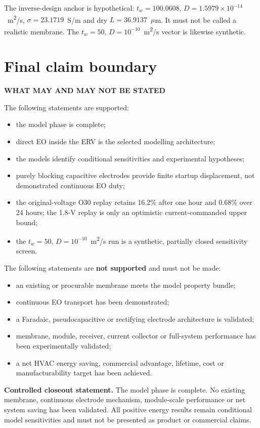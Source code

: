 \documentclass[10pt,a4paper]{article}
\newcommand{\sans}{\fontfamily{qhv}\selectfont}
\newcommand{\eyebrow}[1]{{\sans\bfseries\color{Teal}\MakeUppercase{#1}}\par\vspace{1.2mm}}
\begin{document}
The inverse-design anchor is hypothetical: \(t_w=100.0608\),
\(D=1.5979\times10^{-14}\)~m\textsuperscript{2}/s,
\(\sigma=23.1719\)~S/m and dry \(L=36.9137\)~\(\mu\)m. It must not be called
a realistic membrane. The \(t_w=50\), \(D=10^{-10}\)~m\textsuperscript{2}/s
vector is likewise synthetic.

\clearpage
\section{Final claim boundary}
\eyebrow{What may and may not be stated}

The following statements are supported:
\begin{itemize}
  \item the model phase is complete;
  \item direct EO inside the ERV is the selected modelling architecture;
  \item the models identify conditional sensitivities and experimental hypotheses;
  \item purely blocking capacitive electrodes provide finite startup
  displacement, not demonstrated continuous EO duty;
  \item the original-voltage O30 replay retains 16.2\% after one hour and
  0.68\% over 24 hours; the 1.8-V replay is only an optimistic
  current-commanded upper bound;
  \item the \(t_w=50\), \(D=10^{-10}\)~m\textsuperscript{2}/s run is a
  synthetic, partially closed sensitivity screen.
\end{itemize}

The following statements are \textbf{not supported} and must not be made:
\begin{itemize}
  \item an existing or procurable membrane meets the model property bundle;
  \item continuous EO transport has been demonstrated;
  \item a Faradaic, pseudocapacitive or rectifying electrode architecture is validated;
  \item membrane, module, receiver, current collector or full-system
  performance has been experimentally validated;
  \item a net HVAC energy saving, commercial advantage, lifetime, cost or
  manufacturability target has been achieved.
\end{itemize}

\begin{stopbox}
\textbf{Controlled closeout statement.} The model phase is complete. No
existing membrane, continuous electrode mechanism, module-scale performance or
net system saving has been validated. All positive energy results remain
conditional model sensitivities and must not be presented as product or
commercial claims.
\end{stopbox}
\end{document}
